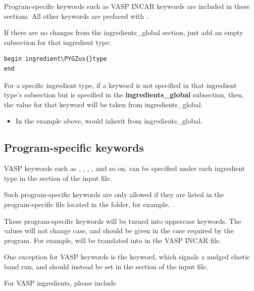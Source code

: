 \documentclass[letterpaper,10pt,english]{sphinxmanual}
\def\PYGZus{\char`\_}
\begin{document}
Program-specific keywords such as VASP INCAR keywords are included in these sections. All other keywords are prefaced with .

If there are no changes from the ingredients\_global section, just add an empty subsection for that ingredient type:

\begin{Verbatim}[commandchars=\\\{\}]
begin ingredient\PYGZus{}type
end
\end{Verbatim}

For a specific ingredient type, if a keyword is not specified in that ingredient type's subsection but is specified in the \textbf{ingredients\_global} subsection, then, the value for that keyword will be taken from ingredients\_global.
\begin{itemize}
\item {} 
In the example above,  would inherit  from ingredients\_global.

\end{itemize}


\subsection{Program-specific keywords}
\label{3_1_2_ingredients:program-specific-keywords}
VASP keywords such as , , , , and so on, can be specified under each ingredient type in the  section of the input file.

Such program-specific keywords are only allowed if they are listed in the program-specific file located in the  folder, for example, .

These program-specific keywords will be turned into uppercase keywords. The values will not change case, and should be given in the case required by the program. For example,  will be translated into  in the VASP INCAR file.

One exception for VASP keywords is the  keyword, which signals a nudged elastic band run, and should instead be set in the  section of the input file.

For VASP ingredients, please include
\end{document}
